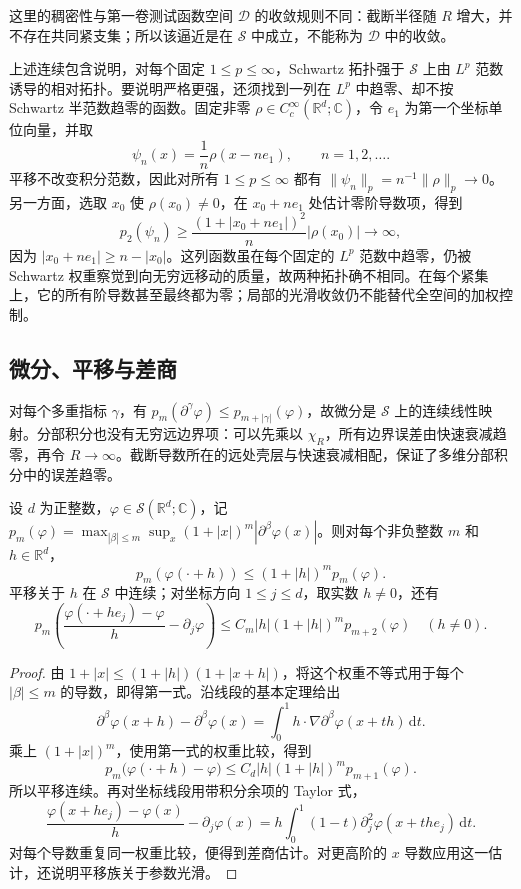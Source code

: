这里的稠密性与第一卷测试函数空间 \(\mathcal D\) 的收敛规则不同：截断半径随 \(R\) 增大，并不存在共同紧支集；所以该逼近是在 \(\mathcal S\) 中成立，不能称为 \(\mathcal D\) 中的收敛。

\ProseParagraphBreak

上述连续包含说明，对每个固定 \(1\leq p\leq\infty\)，Schwartz 拓扑强于 \(\mathcal S\) 上由 \(L^p\) 范数诱导的相对拓扑。要说明严格更强，还须找到一列在 \(L^p\) 中趋零、却不按 Schwartz 半范数趋零的函数。固定非零 \(\rho\in C_c^\infty(\mathbb R^d;\mathbb C)\)，令 \(e_1\) 为第一个坐标单位向量，并取
\[
 \psi_n(x)=\frac1n\rho(x-ne_1),\qquad n=1,2,\ldots.
\]
平移不改变积分范数，因此对所有 \(1\leq p\leq\infty\) 都有 \(\|\psi_n\|_p=n^{-1}\|\rho\|_p\to0\)。另一方面，选取 \(x_0\) 使 \(\rho(x_0)\ne0\)，在 \(x_0+ne_1\) 处估计零阶导数项，得到
\[
 p_2(\psi_n)\geq\frac{(1+|x_0+ne_1|)^2}{n}|\rho(x_0)|\longrightarrow\infty,
\]
因为 \(|x_0+ne_1|\geq n-|x_0|\)。这列函数虽在每个固定的 \(L^p\) 范数中趋零，仍被 Schwartz 权重察觉到向无穷远移动的质量，故两种拓扑确不相同。在每个紧集上，它的所有阶导数甚至最终都为零；局部的光滑收敛仍不能替代全空间的加权控制。

\subsection{微分、平移与差商}
\label{b2:subsec:050103}

对每个多重指标 \(\gamma\)，有 \(p_m(\partial^\gamma\varphi)\leq p_{m+|\gamma|}(\varphi)\)，故微分是 \(\mathcal S\) 上的连续线性映射。分部积分也没有无穷远边界项：可以先乘以 \(\chi_R\)，所有边界误差由快速衰减趋零，再令 \(R\to\infty\)。截断导数所在的远处壳层与快速衰减相配，保证了多维分部积分中的误差趋零。

\begin{lemma}[平移与差商的半范数估计]\label{b2:lem:05-schwartz-translations}
设 \(d\) 为正整数，\(\varphi\in\mathcal S(\mathbb R^d;\mathbb C)\)，记 \(p_m(\varphi)=\max_{|\beta|\leq m}\sup_x(1+|x|)^m|\partial^\beta\varphi(x)|\)。则对每个非负整数 \(m\) 和 \(h\in\mathbb R^d\)，
\[
 p_m(\varphi(\cdot+h))\leq(1+|h|)^m p_m(\varphi).
\]
平移关于 \(h\) 在 \(\mathcal S\) 中连续；对坐标方向 \(1\leq j\leq d\)，取实数 \(h\ne0\)，还有
\[
 p_m\left(\frac{\varphi(\cdot+he_j)-\varphi}{h}-\partial_j\varphi\right)
 \leq C_m|h|(1+|h|)^m p_{m+2}(\varphi)\quad(h\ne0).
\]
\end{lemma}
\begin{proof}
由 \(1+|x|\leq(1+|h|)(1+|x+h|)\)，将这个权重不等式用于每个 \(|\beta|\leq m\) 的导数，即得第一式。沿线段的基本定理给出
\[
 \partial^\beta\varphi(x+h)-\partial^\beta\varphi(x)
 =\int_0^1 h\cdot\nabla\partial^\beta\varphi(x+th)\,\mathrm{d}t.
\]
乘上 \((1+|x|)^m\)，使用第一式的权重比较，得到
\[
 p_m\bigl(\varphi(\mathord\cdot+h)-\varphi\bigr)
 \le C_d|h|(1+|h|)^m p_{m+1}(\varphi).
\]
所以平移连续。再对坐标线段用带积分余项的 Taylor 式，
\[
 \frac{\varphi(x+he_j)-\varphi(x)}h-\partial_j\varphi(x)
 =h\int_0^1(1-t)\partial_j^2\varphi(x+the_j)\,\mathrm{d}t.
\]
对每个导数重复同一权重比较，便得到差商估计。对更高阶的 \(x\) 导数应用这一估计，还说明平移族关于参数光滑。
\end{proof}

